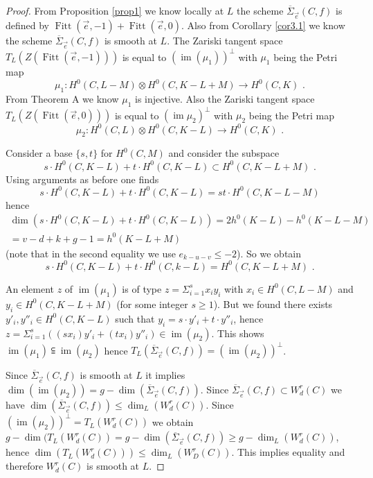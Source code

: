 \documentclass{article}
\DeclareMathOperator{\im}{im}
\DeclareMathOperator{\Fitt}{Fitt}
\theoremstyle{definition}
\theoremstyle{remark}
\begin{document}
\begin{proof}
From Proposition \ref{prop1} we know locally at $L$ the scheme $\overline{\Sigma}_{\overrightarrow {e}}(C,f)$ is defined by $\Fitt (\overrightarrow {e},-1)+\Fitt (\overrightarrow {e},0)$.
Also from Corollary \ref{cor3.1} we know the scheme $\overline{\Sigma}_{\overrightarrow {e}}(C,f)$ is smooth at $L$.
The Zariski tangent space $T_L(Z(\Fitt(\overrightarrow {e},-1)))$ is equal to $(\im (\mu_1))^{\perp}$ with $\mu _1$ being the Petri map
\[
\mu_1 : H^0(C,L-M) \otimes H^0(C,K-L+M) \rightarrow H^0(C,K) \text { .}
\]
From Theorem A we know $\mu _1$ is injective.
Also the Zariski tangent space $T_L (Z(\Fitt (\overrightarrow {e},0)))$ is  equal to $(\im \mu_2)^{\perp}$ with $\mu_2$ being the Petri map
\[
\mu_2 : H^0(C,L) \otimes H^0(C,K-L) \rightarrow H^0(C,K) \text { .}
\]

Consider a base $\{ s,t \}$ for $H^0(C,M)$ and consider the subspace
\[
s \cdot H^0(C,K-L)+t \cdot H^0(C,K-L) \subset H^0(C,K-L+M) \text { .}
\]
Using arguments as before one finds
\[
s \cdot H^0(C,K-L)+t \cdot H^0(C,K-L)=st \cdot H^0(C,K-L-M)
\]
hence
\begin{multline*}
\dim (s \cdot H^0(C,K-L)+t \cdot H^0(C,K-L))=2h^0(K-L)-h^0(K-L-M) \\
=v-d+k+g-1=h^0(K-L+M)
\end{multline*}
(note that in the second equality we use $e_{k-u-v}\leq -2$).
So we obtain
\[
s \cdot H^0(C,K-L)+ t \cdot H^0(C,k-L) = H^0(C,K-L+M) \text { .}
\]

An element $z$ of $\im (\mu_1)$ is of type $z=\Sigma_{i=1}^s x_iy_i$ with $x_i \in H^0(C,L-M)$ and $y_i \in H^0(C,K-L+M)$ (for some integer $s \geq 1$).
But we found there exists $y'_i, y''_i \in H^0(C,K-L)$ such that $y_i=s\cdot y'_i+t\cdot y''_i$, hence $z = \Sigma _{i=1}^s ((sx_i)y'_i+(tx_i)y''_i) \in \im (\mu _2)$.
This shows $\im (\mu_1 ) \subseteqq \im (\mu_2)$ hence $T_L(\overline {\Sigma}_{\overrightarrow {e}}(C,f))=(\im (\mu _2))^{\perp}$.

Since $\overline{\Sigma}_{\overrightarrow {e}}(C,f)$ is smooth at $L$ it implies $\dim (\im (\mu_2))=g-\dim (\overline{\Sigma}_{\overrightarrow {e}}(C,f))$.
Since $\overline{\Sigma}_{\overrightarrow {e}}(C,f) \subset W^r_d(C)$ we have $\dim (\overline{\Sigma}_{\overrightarrow {e}}(C,f)) \leq \dim _L (W^r_d(C))$.
Since $(\im (\mu_2))^{\perp} = T_L(W^r_d(C))$ we obtain $g-\dim (T_L(W^r_d(C)) = g-\dim(\overline{\Sigma}_{\overrightarrow {e}}(C,f)) \geq g-\dim _L(W^r_d(C))$, hence $\dim (T_L (W^r_d(C))) \leq \dim _L (W^r_D(C))$.
This implies equality and therefore $W^r_d(C)$ is smooth at $L$.
\end{proof}
\end{document}
